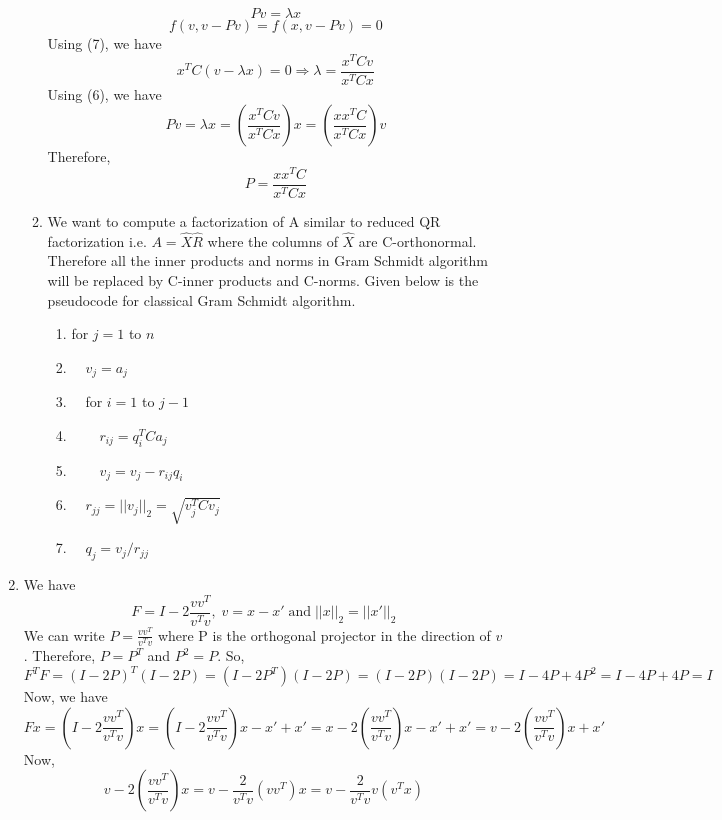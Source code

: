 \documentclass{article}
\begin{document}
\begin{enumerate}
\begin{enumerate}[label=(\alph*)]
        \begin{equation}
        Pv = \lambda x
        \end{equation}
        \begin{equation}
        f(v, v - Pv) = f(x, v - Pv) = 0
        \end{equation}
        Using (7), we have
        $$x^TC(v - \lambda x) = 0 \Rightarrow \lambda = \frac{x^TCv}{x^TCx}$$
        Using (6), we have
        $$Pv = \lambda x = (\frac{x^TCv}{x^TCx})x = (\frac{xx^TC}{x^TCx})v$$
        Therefore,
        $$P = \frac{xx^TC}{x^TCx}$$
        \item We want to compute a factorization of A similar to reduced QR factorization i.e. $A = \hat{X}\hat{R}$ where the columns of $\hat{X}$ are C-orthonormal. Therefore all the inner products and norms in Gram Schmidt algorithm will be replaced by C-inner products and C-norms. Given below is the pseudocode for classical Gram Schmidt algorithm.
        \begin{enumerate}
            \item for $j = 1$ to $n$
            \item $\quad v_j = a_j$
            \item $\quad$for $i = 1$ to $j - 1$
            \item $\quad \quad r_{ij} = q_i^TCa_j$
            \item $\quad \quad v_j = v_j - r_{ij}q_i$
            \item $\quad r_{jj} = ||v_j||_2 = \sqrt{v_j^TCv_j}$
            \item $\quad q_j = v_j / r_{jj}$
        \end{enumerate}
    \end{enumerate}
    \item We have
    $$F = I - 2\frac{vv^T}{v^Tv}, \; v = x - x' \; \textrm{and} \; ||x||_2 = ||x'||_2$$
    We can write $P = \frac{vv^T}{v^Tv}$ where P is the orthogonal projector in the direction of $v$. Therefore, $P = P^T$ and $P^2 = P$. So,
    $$F^TF = (I - 2P)^T(I - 2P) = (I - 2P^T)(I - 2P) = (I - 2P)(I - 2P) = I - 4P + 4 P^2 = I - 4P + 4P = I$$
    Now, we have
    \begin{equation}
    Fx = (I - 2\frac{vv^T}{v^Tv})x = (I - 2\frac{vv^T}{v^Tv})x - x' + x' = x - 2(\frac{vv^T}{v^Tv})x - x' + x' = v - 2(\frac{vv^T}{v^Tv})x + x'
    \end{equation}
    Now,
    \begin{equation}
    v - 2(\frac{vv^T}{v^Tv})x = v - \frac{2}{v^Tv}(vv^T)x = v - \frac{2}{v^Tv}v(v^Tx)

\end{equation}
\end{enumerate}
\end{document}
